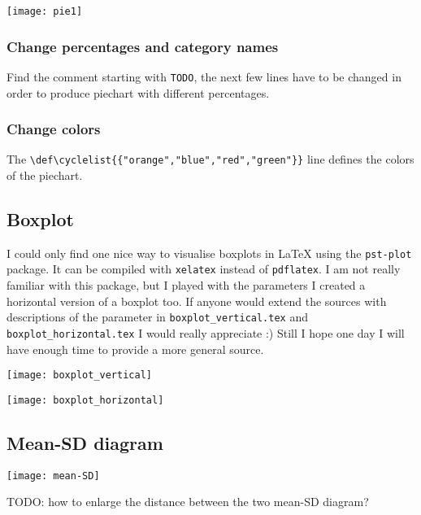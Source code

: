\documentclass[a4paper]{article}
\begin{document}
	\begin{center}
		\texttt{[image: pie1]}
				
		
	\end{center}
	
	
	\subsubsection*{Change percentages and category names}
	 Find the comment starting with \texttt{TODO}, the next few lines have to be changed in order to 
	 produce piechart with different percentages.
		
	\subsubsection*{Change colors}
	The \verb.\def\cyclelist{{"orange","blue","red","green"}}. line defines the colors of the piechart. 
	
	
	\subsection{Boxplot}
	I could only find one nice way to visualise boxplots in \LaTeX{} using the \texttt{pst-plot} package. It can be compiled with \texttt{xelatex} instead of \texttt{pdflatex}. I am not really familiar with this package, but I played with the parameters I created a horizontal version of a boxplot too. If anyone would extend the sources with descriptions of the parameter in \texttt{boxplot\_vertical.tex} and \texttt{boxplot\_horizontal.tex} I would really appreciate :) Still I hope one day I will have enough time to provide a more general source.
	
	\begin{center}
		\texttt{[image: boxplot\_vertical]}
		
		\texttt{[image: boxplot\_horizontal]}
	\end{center}
	
	\subsection{Mean-SD diagram}
		\begin{center}
		\texttt{[image: mean-SD]}
		
		TODO: how to enlarge the distance between the two mean-SD diagram?
	\end{center}
	
\end{document}
